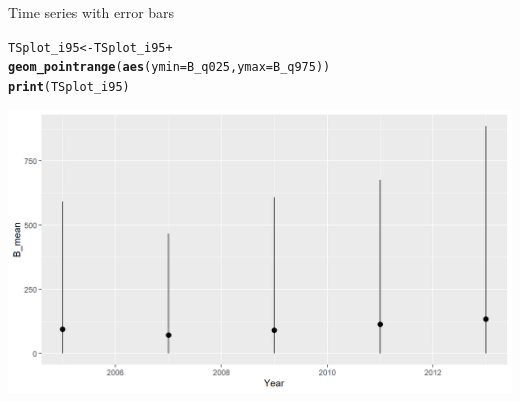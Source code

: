 \documentclass{beamer}\usepackage[]{graphicx}\usepackage[]{color}
\makeatletter
\newcommand{\hlopt}[1]{\textcolor[rgb]{0,0,0}{#1}}%
\newcommand{\hlstd}[1]{\textcolor[rgb]{0.345,0.345,0.345}{#1}}%
\newcommand{\hlkwb}[1]{\textcolor[rgb]{0.69,0.353,0.396}{#1}}%
\newcommand{\hlkwc}[1]{\textcolor[rgb]{0.333,0.667,0.333}{#1}}%
\newcommand{\hlkwd}[1]{\textcolor[rgb]{0.737,0.353,0.396}{\textbf{#1}}}%
\newenvironment{kframe}{%
 \def\at@end@of@kframe{}%
 \ifinner\ifhmode%
  \def\at@end@of@kframe{\end{minipage}}%
  \begin{minipage}{\columnwidth}%
 \fi\fi%
 \def\FrameCommand##1{\hskip\@totalleftmargin \hskip-\fboxsep
 \colorbox{shadecolor}{##1}\hskip-\fboxsep
     \hskip-\linewidth \hskip-\@totalleftmargin \hskip\columnwidth}%
 \MakeFramed {\advance\hsize-\width
   \@totalleftmargin\z@ \linewidth\hsize
   \@setminipage}}%
 {\par\unskip\endMakeFramed%
 \at@end@of@kframe}
\newenvironment{knitrout}{}{} %
\makeatother
\begin{document}
\begin{frame}[fragile]{Time series with error bars}
\begin{knitrout}\footnotesize
{}\color{fgcolor}\begin{kframe}
\begin{alltt}
\hlstd{TSplot_i95} \hlkwb{<-} \hlstd{TSplot_i95} \hlopt{+}
  \hlkwd{geom_pointrange}\hlstd{(}\hlkwd{aes}\hlstd{(}\hlkwc{ymin} \hlstd{= B_q025,} \hlkwc{ymax} \hlstd{= B_q975))}
\hlkwd{print}\hlstd{(TSplot_i95)}
\end{alltt}
\end{kframe}

{\centering \includegraphics[width=.9\linewidth]{figure/sp_TSplot_i95b-1} 

}



\end{knitrout}
\end{frame}
\end{document}
